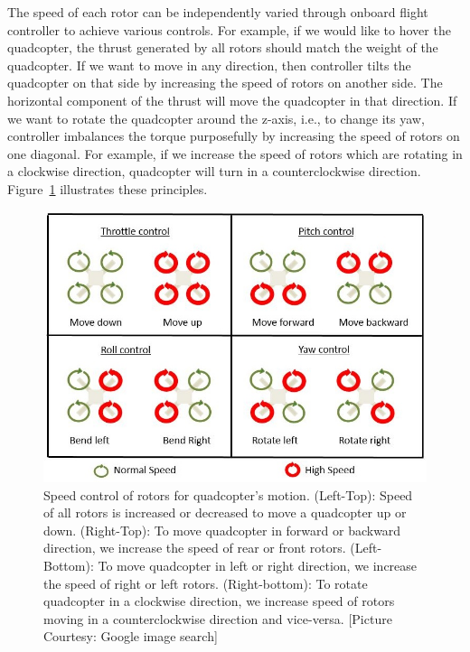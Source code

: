 The speed of each rotor can be independently varied through onboard flight
controller to achieve various controls. For example, if we would like to hover
the quadcopter, the thrust generated by all rotors should match the weight of the
quadcopter. If we want to move in any direction, then controller tilts the
quadcopter on that side by increasing the speed of rotors on another side. The
horizontal component of the thrust will move the quadcopter in that direction.
If we want to rotate the quadcopter around the z-axis, i.e., to change its yaw,
controller imbalances the torque purposefully by increasing the speed of rotors on
one diagonal. For example, if we increase the speed of rotors which are rotating in
a clockwise direction, quadcopter will turn in a counterclockwise direction.
Figure~\ref{fig:quadcopterMotion} illustrates these principles.

\begin{figure}[h!]
  \includegraphics[width=\textwidth]{images/quadcopterMotion.jpg}
  \caption[Speed control of rotors for quadcopter's motion]{Speed control of
  rotors for quadcopter's motion.
  (Left-Top): Speed of all rotors is increased or decreased to move
  a quadcopter up or down.
  (Right-Top): To move quadcopter in forward or backward direction, we increase
  the speed of rear or front rotors.
  (Left-Bottom): To move quadcopter in left or right direction, we increase
  the speed of right or left rotors.
  (Right-bottom): To rotate quadcopter in a clockwise direction, we increase speed
  of rotors moving in a counterclockwise direction and vice-versa. 
   [Picture Courtesy: Google image search]}
  \label{fig:quadcopterMotion}	
\end{figure}

